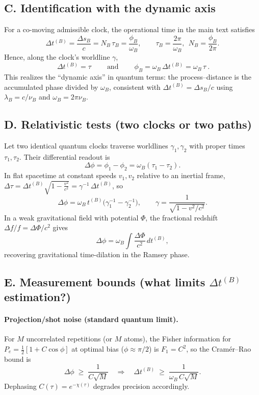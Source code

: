 \documentclass[12pt]{article}
\begin{document}
\subsection*{C. Identification with the dynamic axis}
For a co-moving admissible clock, the operational time in the main text satisfies
\[
\Delta t^{(B)}=\frac{\Delta s_B}{c}=N_B\,\tau_B=\frac{\phi_B}{\omega_B},
\qquad \tau_B=\frac{2\pi}{\omega_B},\ \ N_B=\frac{\phi_B}{2\pi}.
\]
Hence, along the clock’s worldline \(\gamma\),
\[
\boxed{\ \Delta t^{(B)}=\tau\ } \qquad\text{and}\qquad
\boxed{\ \phi_B=\omega_B\,\Delta t^{(B)}=\omega_B\,\tau\ }.
\]
This realizes the “dynamic axis” in quantum terms: the process–distance is the accumulated
phase divided by \(\omega_B\), consistent with \(\Delta t^{(B)}=\Delta s_B/c\) using
\(\lambda_B=c/\nu_B\) and \(\omega_B=2\pi\nu_B\).

\subsection*{D. Relativistic tests (two clocks or two paths)}
Let two identical quantum clocks traverse worldlines \(\gamma_1,\gamma_2\) with proper times
\(\tau_1,\tau_2\). Their differential readout is
\[
\Delta\phi=\phi_1-\phi_2=\omega_B(\tau_1-\tau_2).
\]
In flat spacetime at constant speeds \(v_1,v_2\) relative to an inertial frame,
\(\Delta\tau = \Delta t^{(B)}\sqrt{1-\frac{v^2}{c^2}} = \gamma^{-1}\,\Delta t^{(B)}\), so
\[
\Delta\phi=\omega_B\,t^{(B)}\big(\gamma^{-1}_1-\gamma^{-1}_2\big),
\qquad \gamma=\frac{1}{\sqrt{1-v^2/c^2}}.
\]
In a weak gravitational field with potential \(\Phi\), the fractional redshift
\(\Delta f/f=\Delta\Phi/c^2\) gives
\[
\Delta\phi=\omega_B\!\int\!\frac{\Delta\Phi}{c^2}\,dt^{(B)},
\]
recovering gravitational time-dilation in the Ramsey phase. \cite{Will2014}

\subsection*{E. Measurement bounds (what limits \(\Delta t^{(B)}\) estimation?)}

\paragraph{Projection/shot noise (standard quantum limit).}
For \(M\) uncorrelated repetitions (or \(M\) atoms), the Fisher information for
\(P_e=\tfrac{1}{2}[1+C\cos\phi]\) at optimal bias (\(\phi\approx\pi/2\)) is \(F_1=C^2\),
so the Cram\'er–Rao bound is
\[
\Delta\phi \;\ge\; \frac{1}{C\sqrt{M}}
\quad\Rightarrow\quad
\Delta t^{(B)} \;\ge\; \frac{1}{\omega_B\,C\sqrt{M}}.
\]
Dephasing \(C(\tau)=e^{-\chi(\tau)}\) degrades precision accordingly.
\cite{Giovannetti2011}
\end{document}
